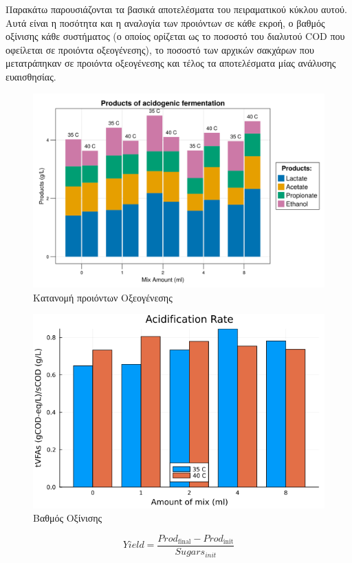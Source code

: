 \documentclass[11pt]{article}
\begin{document}
Παρακάτω παρουσιάζονται τα βασικά αποτελέσματα του πειραματικού κύκλου αυτού. Αυτά είναι η ποσότητα και η αναλογία των προιόντων σε κάθε εκροή, ο βαθμός οξίνισης κάθε συστήματος (ο οποίος ορίζεται ως το ποσοστό του διαλυτού COD που οφείλεται σε προιόντα οξεογένεσης), το ποσοστό των αρχικών σακχάρων που μετατράπηκαν σε προιόντα οξεογένεσης και τέλος τα αποτελέσματα μίας ανάλυσης ευαισθησίας.

\begin{figure}[htbp]
\centering
\includegraphics[width=.9\linewidth]{../plots/35_40_comp/final_products.png}
\caption{Κατανομή προιόντων Οξεογένεσης}
\end{figure}

\begin{figure}[htbp]
\centering
\includegraphics[width=.9\linewidth]{../plots/35_40_comp/acidification_comp.png}
\caption{Βαθμός Οξίνισης}
\end{figure}

\begin{equation}
\tag{2}
Yield = \frac{Prod_{\text{final}} - Prod_{\text{init}}}{Sugars_{init}}
\label{eqn:2}
\end{equation}
\end{document}
